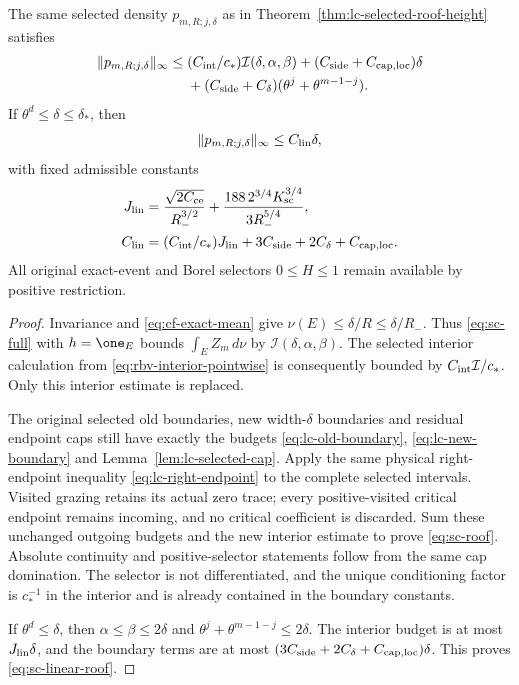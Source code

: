 \begin{theorem}
\label{thm:sc-roof}
The same selected density $p_{m,R;j,\delta}$ as in
Theorem~\ref{thm:lc-selected-roof-height} satisfies
\begin{equation}\label{eq:sc-roof}
\begin{split}
 \|p_{m,R;j,\delta}\|_\infty
 \le{}& (C_{\rm int}/c_*)\mathcal I(\delta,\alpha,\beta)
           +(C_{\rm side}+C_{\rm cap,loc})\delta\\
      &+(C_{\rm side}+C_\delta)(\theta^j+\theta^{m-1-j}).
\end{split}
\end{equation}
If $\theta^d\le\delta\le\delta_*$, then
\begin{equation}\label{eq:sc-linear-roof}
                    \|p_{m,R;j,\delta}\|_\infty\le C_{\rm lin}\delta,
\end{equation}
with fixed admissible constants
\begin{align}
 J_{\rm lin}
   &=\frac{\sqrt{2C_{\rm ce}}}{R_-^{3/2}}
     +\frac{188\,2^{3/4}K_{\rm sc}^{3/4}}{3R_-^{5/4}},
                                        \label{eq:sc-linear-constants}\\
 C_{\rm lin}
   &=(C_{\rm int}/c_*)J_{\rm lin}
       +3C_{\rm side}+2C_\delta+C_{\rm cap,loc}.\notag
\end{align}
All original exact-event and Borel selectors $0\le H\le1$ remain
available by positive restriction.
\end{theorem}
\begin{proof}
Invariance and \eqref{eq:cf-exact-mean} give
$\nu(E)\le\delta/R\le\delta/R_-$.  Thus \eqref{eq:sc-full} with
$h=\one_E$ bounds $\int_E Z_m\,d\nu$ by
$\mathcal I(\delta,\alpha,\beta)$.  The selected interior calculation
from \eqref{eq:rbv-interior-pointwise} is consequently bounded by
$C_{\rm int}\mathcal I/c_*$.  Only this interior estimate is replaced.

The original selected old boundaries, new width-$\delta$ boundaries
and residual endpoint caps still have exactly the budgets
\eqref{eq:lc-old-boundary}, \eqref{eq:lc-new-boundary} and
Lemma~\ref{lem:lc-selected-cap}.  Apply the same physical
right-endpoint inequality \eqref{eq:lc-right-endpoint} to the complete
selected intervals.  Visited grazing retains its actual zero trace;
every positive-visited critical endpoint remains incoming, and no
critical coefficient is discarded.  Sum these unchanged outgoing
budgets and the new interior estimate to prove \eqref{eq:sc-roof}.
Absolute continuity and positive-selector statements follow from the
same cap domination.  The selector is not differentiated, and the
unique conditioning factor is $c_*^{-1}$ in the interior and is
already contained in the boundary constants.

If $\theta^d\le\delta$, then $\alpha\le\beta\le2\delta$ and
$\theta^j+\theta^{m-1-j}\le2\delta$.  The interior budget is at most
$J_{\rm lin}\delta$, and the boundary terms are at most
$(3C_{\rm side}+2C_\delta+C_{\rm cap,loc})\delta$.  This proves
\eqref{eq:sc-linear-roof}.
\end{proof}

